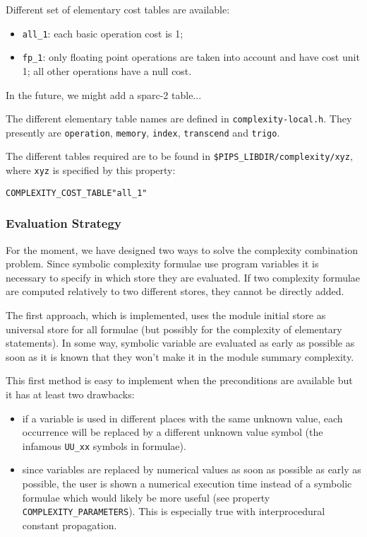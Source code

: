 \documentclass[a4paper]{report}
\newenvironment{PipsProp}{\begin{alltt}}{\end{alltt}}
\begin{document}
Different set of elementary cost tables are available:

\begin{itemize}

  \item \verb+all_1+: each basic operation cost is 1;

  \item \verb+fp_1+: only floating point operations are taken into
account and have cost unit 1; all other operations have a null cost.

\end{itemize}

In the future, we might add a sparc-2 table...

The different elementary table names are defined in
\verb+complexity-local.h+. They presently are \verb+operation+,
\verb+memory+, \verb+index+, \verb+transcend+
and \verb+trigo+.

The different tables required are to be found in
\verb+$PIPS_LIBDIR/complexity/xyz+,
where \verb+xyz+ is specified by this property:

\begin{PipsProp}
COMPLEXITY_COST_TABLE "all_1"
\end{PipsProp}

\subsubsection{Evaluation Strategy}

For the moment, we have designed two ways to solve the complexity
combination problem. Since symbolic complexity formulae use program
variables it is necessary to specify in which store they are
evaluated. If two complexity formulae are computed relatively to two
different stores, they cannot be directly added.

The first approach, which is implemented, uses the module initial store
as universal store for all formulae (but possibly for the complexity of
elementary statements).  In some way, symbolic variable are evaluated as
early as possible as soon as it is known that they won't make it in the
module summary complexity.

This first method is easy to implement when the preconditions are available
but it has at least two drawbacks:

\begin{itemize}

  \item if a variable is used in different places with the same unknown
value, each occurrence will be replaced by a different unknown value
symbol (the infamous \verb+UU_xx+ symbols in formulae).

  \item since variables are replaced by numerical values as soon as
possible as early as possible, the user is shown a numerical execution
time instead of a symbolic formulae which would likely be more useful
(see property \verb+COMPLEXITY_PARAMETERS+). This is especially true
with interprocedural constant propagation.

\end{itemize}
\end{document}
